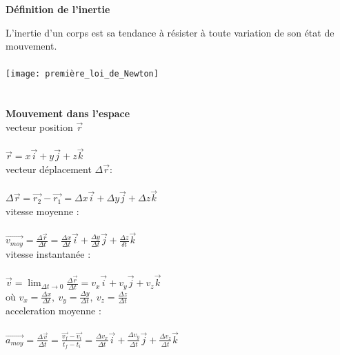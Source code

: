 \documentclass[]{article}
\begin{document}
\textbf{Définition de l'inertie}

L'inertie d'un corps est sa tendance à résister à toute variation de son état de mouvement.\\\\
\texttt{[image: première\_loi\_de\_Newton]}\\\\\\
\textbf{Mouvement dans l'espace}\\

vecteur position $\overrightarrow{r}$\\\\
\indent \indent $\overrightarrow{r} = x\overrightarrow{i} + y\overrightarrow{j} + z\overrightarrow{k}$\\

vecteur déplacement $\Delta \overrightarrow{r}$:\\\\
\indent \indent $\Delta \overrightarrow{r} = \overrightarrow{r_2} - \overrightarrow{r_1} = \Delta x \overrightarrow{i} + \Delta y\overrightarrow{j}+\Delta z\overrightarrow{k}$\\

vitesse moyenne :\\\\
\indent \indent $\overrightarrow{v_{moy}} = \frac{\Delta\overrightarrow{r}}{\Delta t} = \frac{\Delta x}{\Delta t}\overrightarrow{i} + \frac{\Delta y}{\Delta t}\overrightarrow{j} + \frac{\Delta z}{\delta t}\overrightarrow{k}$\\

vitesse instantanée :\\\\
\indent \indent $\overrightarrow{v} = \displaystyle \lim_{\Delta t \to 0}\frac{\Delta \overrightarrow{r}}{\Delta t} = v_x\overrightarrow{i} + v_y\overrightarrow{j} + v_z\overrightarrow{k}$\\
\indent \indent où $v_x = \frac{\Delta x}{\Delta t},~v_y = \frac{\Delta y}{\Delta t},~v_z = \frac{\Delta z}{\Delta t}$\\

acceleration moyenne :\\\\
\indent \indent $\overrightarrow{a_{moy}} = \frac{\Delta \overrightarrow{v}}{\Delta t} = \frac{\overrightarrow{v_f} - \overrightarrow{v_i}}{t_f-t_i} = \frac{\Delta v_x}{\Delta t}\overrightarrow{i} + \frac{\Delta v_y}{\Delta t}\overrightarrow{j} +\frac{\Delta v_z}{\Delta t}\overrightarrow{k}$\\
\newpage
\end{document}
